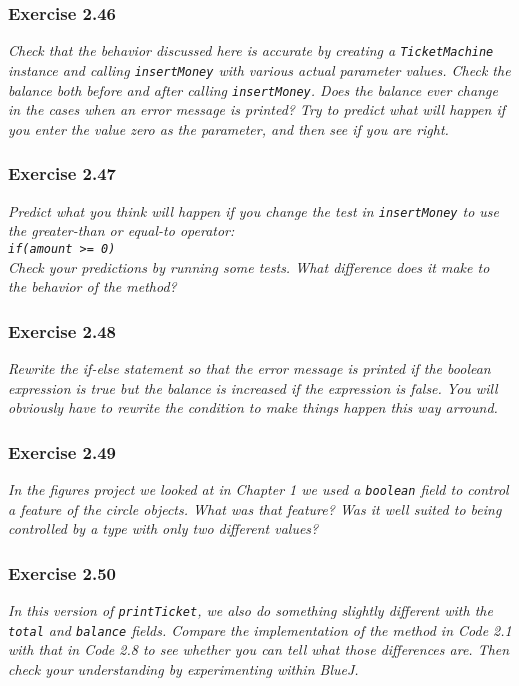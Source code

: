 \subsubsection*{Exercise 2.46}
\textit{Check that the behavior discussed here is accurate by creating a 
\lstinline?TicketMachine? instance and calling \lstinline?insertMoney? with 
various actual parameter values. Check the balance both before and after 
calling \lstinline?insertMoney?. Does the balance ever change in the cases 
when an error message is printed? Try to predict what will happen if you enter 
the value zero as the parameter, and then see if you are right. }\\

\subsubsection*{Exercise 2.47}
\textit{Predict what you think will happen if you change the test in 
\lstinline?insertMoney? to use the greater-than or equal-to operator: \\
\lstinline?if(amount >= 0)?\\
Check your predictions by running some tests. What difference does it make to 
the behavior of the method? }\\

\subsubsection*{Exercise 2.48}
\textit{Rewrite the if-else statement so that the error message is printed if 
the boolean expression is true but the balance is increased if the expression 
is false. You will obviously have to rewrite the condition to make things 
happen this way arround. }\\

\subsubsection*{Exercise 2.49}
\textit{In the figures project we looked at in Chapter 1 we used a 
\lstinline?boolean? field to control a feature of the circle objects. What was 
that feature? Was it well suited to being controlled by a type with only two 
different values? }\\

\subsubsection*{Exercise 2.50}
\textit{In this version of \lstinline{printTicket}, we also do something 
slightly different with the \lstinline{total} and \lstinline{balance} fields. 
Compare the implementation of the method in Code 2.1 with that in Code 2.8 to 
see whether you can tell what those differences are. Then check your 
understanding by experimenting within BlueJ. }\\

